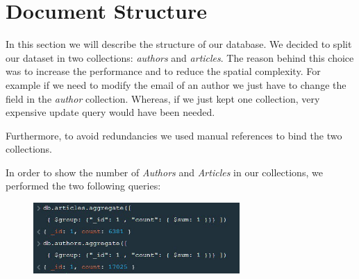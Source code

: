 \documentclass{Configuration_Files/PoliMi3i_thesis}
\begin{document}
\chapter{Document Structure}
\label{ch:document_structure}
In this section we will describe the structure of our database. We decided to split our dataset in two collections:
\emph{authors} and \emph{articles}. The reason behind this choice was to increase the performance and to reduce the
spatial complexity. For example if we need to modify the email of an author we just have to change the field in the
\emph{author} collection. Whereas, if we just kept one collection, very expensive update query would have been needed.\newline

Furthermore, to avoid redundancies we used manual references to bind the two collections.\newline

In order to show the number of \emph{Authors} and \emph{Articles} in our collections, we performed the two following queries:
\begin{figure}[H]
\centering
\includegraphics[width=0.7\textwidth]{instancenumber.jpg}
\label{fig:instances}
\end{figure}
\end{document}
